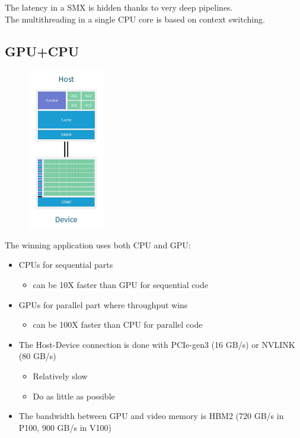 The latency in a SMX is hidden thanks to very deep pipelines.\\
The multithreading in a single CPU core is based on context switching.\\



\subsection{GPU+CPU}

\begin{figure}
	\begin{center}
		\includegraphics[width=0.3\textwidth]{figure_parallel/GPU_CPU.png}
	\end{center}
\end{figure}

The winning application uses both CPU and GPU:

\begin{itemize}
	\item CPUs for sequential parts
	\begin{itemize}
		\item can be 10X faster than GPU for sequential code
	\end{itemize}
	\item GPUs for parallel part where throughput wins
	\begin{itemize}
		\item can be 100X faster than CPU for parallel code
	\end{itemize}
	\item The Host-Device connection is done with PCIe-gen3 (16 GB/s) or NVLINK (80 GB/s)
	\begin{itemize}
		\item Relatively slow
		\item Do as little as possible
	\end{itemize}
	\item The bandwidth between GPU and video memory is HBM2 (720 GB/s in P100, 900 GB/s in V100)
\end{itemize}


